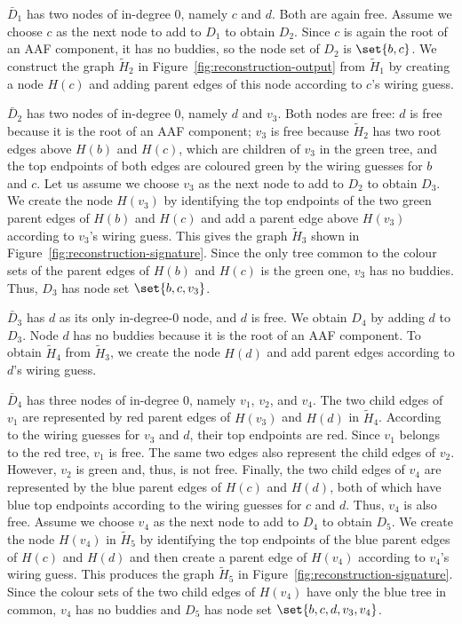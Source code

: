 $\bar D_1$ has two nodes of in-degree $0$, namely $c$ and $d$.
Both are again free.
Assume we choose $c$ as the next node to add to $D_1$ to obtain $D_2$.
Since $c$ is again the root of an AAF component, it has no buddies, so the
node set of $D_2$ is $\set{b, c}$.
We construct the graph $\tilde H_2$ in Figure~\ref{fig:reconstruction-output}
from $\tilde H_1$ by creating a node $H(c)$ and {adding} parent edges of this node
according to $c$'s wiring guess.

$\bar D_2$ has two nodes of in-degree $0$, namely $d$ and $v_3$.
Both nodes are free: $d$ is free {because it is the root of an AAF component}; $v_3$ is free because $\tilde H_2$ has two root
edges above $H(b)$ and $H(c)$, which are children of $v_3$ in the green tree,
and the top endpoints of both edges are coloured green by the wiring guesses
for $b$ and $c$.
Let us assume we choose $v_3$ as the next node to add to $D_2$ to obtain
$D_3$.
We create the node $H(v_3)$ by identifying the top endpoints of the two green
parent edges of $H(b)$ and $H(c)$ and add a parent edge above $H(v_3)$
according to $v_3$'s wiring guess.
This gives the graph $\tilde H_3$ shown in
Figure~\ref{fig:reconstruction-signature}.
Since the only tree common to the colour sets of the parent edges of $H(b)$
and $H(c)$ is the green one, $v_3$ has no buddies.
Thus, $D_3$ has node set $\set{b, c, v_3}$.

$\bar D_3$ has $d$ as its only in-degree-$0$ node, and $d$ is free.
We obtain $D_4$ by adding $d$ to $D_3$.
Node $d$ has no buddies because it is the root of an AAF component.
To obtain $\tilde H_4$ from $\tilde H_3$, we create the node
$H(d)$ and add parent edges according to $d$'s wiring guess.

$\bar D_4$ has three nodes of in-degree $0$, namely $v_1$, $v_2$, and $v_4$.
The two child edges of $v_1$ are represented by red parent edges of
$H(v_3)$ and $H(d)$ in $\tilde H_4$.
According to the wiring guesses for $v_3$ and $d$, their top endpoints are
red.
Since $v_1$ belongs to the red tree, $v_1$ is free.
The same two edges also represent the child edges of $v_2$.
However, $v_2$ is green and, thus, is not free.
Finally, the two child edges of $v_4$ are represented by the blue parent
edges of $H(c)$ and $H(d)$, both of which have blue top endpoints according
to the wiring guesses for $c$ and $d$.
Thus, $v_4$ is also free.
Assume we choose $v_4$ as the next node to add to $D_4$ to obtain $D_5$.
We create the node $H(v_4)$ in $\tilde H_5$ by identifying the top endpoints
of the blue parent edges of $H(c)$ and $H(d)$ and then create a parent edge
of $H(v_4)$ according to $v_4$'s wiring guess.
This produces the graph $\tilde H_5$ in
Figure~\ref{fig:reconstruction-signature}.
Since the colour sets of the two child edges of $H(v_4)$ have only the blue tree
in common, $v_4$ has no buddies and $D_5$ has node set
$\set{b, c, d, v_3, v_4}$.

